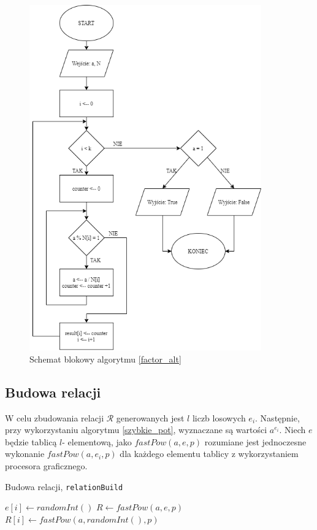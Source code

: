 \documentclass[]{article}
\begin{document}
		\begin{figure}[H]
			\begin{center}
				\includegraphics[width=10cm]{alg 5.png} \caption{Schemat blokowy algorytmu \ref{factor_alt}}
			\end{center}
		\end{figure}
	
	
	
	\subsection{Budowa relacji}
		W celu zbudowania relacji \(\mathcal{R}\) generowanych jest \(l\) liczb losowych \(e_i\). Następnie, przy wykorzystaniu algorytmu \ref{szybkie_pot}, wyznaczane są wartości \(a^{e_i}\). 
		\newline
		Niech \(e\) będzie tablicą \(l\)- elementową, jako \(fastPow(a, e, p)\) rozumiane jest jednoczesne wykonanie \(fastPow(a, e_i, p)\) dla każdego elementu tablicy z wykorzystaniem procesora graficznego. 
		\newline
		\begin{algorithm}[H]
			\SetAlgoLined
			\caption{Budowa relacji, \texttt{relationBuild}}
			\label{relation}
			{
				\(e[i] \gets randomInt()\)
			}
			\(R \gets fastPow(a, e, p)\) \\
			{
				{
					\(R[i] \gets fastPow(a, randomInt(), p)\)
				}
			}
		
		\end{algorithm}
\end{document}

